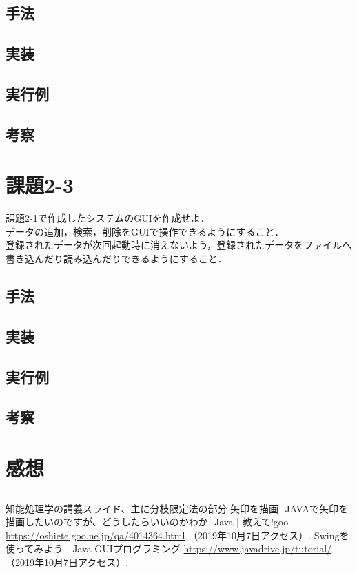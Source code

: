 \documentclass{jarticle}
\begin{document}
\subsection{手法}

\subsection{実装}

\subsection{実行例}

\subsection{考察}

\section{課題2-3}
\begin{screen}
    課題2-1で作成したシステムのGUIを作成せよ．
    \\ データの追加，検索，削除をGUIで操作できるようにすること．
    \\ 登録されたデータが次回起動時に消えないよう，登録されたデータをファイルへ書き込んだり読み込んだりできるようにすること．
\end{screen}
\subsection{手法}

\subsection{実装}

\subsection{実行例}

\subsection{考察}

\section{感想}
\subsection{}

\begin{thebibliography}{99}
   知能処理学の講義スライド、主に分枝限定法の部分
   矢印を描画 -JAVAで矢印を描画したいのですが、どうしたらいいのかわか- Java | 教えて!goo
  \url{https://oshiete.goo.ne.jp/qa/4014364.html} （2019年10月7日アクセス）.
   Swingを使ってみよう - Java GUIプログラミング
  \url{https://www.javadrive.jp/tutorial/} （2019年10月7日アクセス）.
\end{thebibliography}
\end{document}
